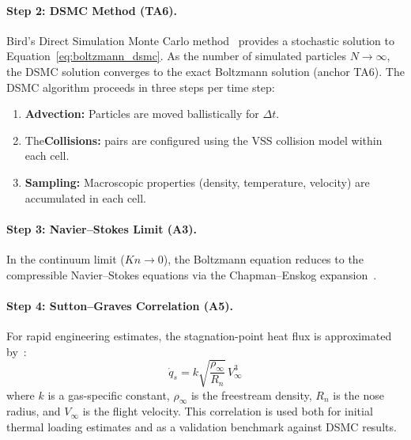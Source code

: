 \paragraph{Step 2: DSMC Method (TA6).}
Bird's Direct Simulation Monte Carlo method~\cite{bird1994molecular} provides a stochastic solution to Equation~\eqref{eq:boltzmann_dsmc}. As the number of simulated particles $N \to \infty$, the DSMC solution converges to the exact Boltzmann solution (anchor TA6). The DSMC algorithm proceeds in three steps per time step:
\begin{enumerate}
    \item \textbf{Advection:} Particles are moved ballistically for $\Delta t$.

    \item The\textbf{Collisions:} pairs are configured using the VSS collision model within each cell.

    \item \textbf{Sampling:} Macroscopic properties (density, temperature, velocity) are accumulated in each cell.
\end{enumerate}

\paragraph{Step 3: Navier--Stokes Limit (A3).}
In the continuum limit ($Kn \to 0$), the Boltzmann equation reduces to the compressible Navier--Stokes equations via the Chapman--Enskog expansion~\cite{chapman1970kinetic}.

\paragraph{Step 4: Sutton--Graves Correlation (A5).}
For rapid engineering estimates, the stagnation-point heat flux is approximated by~\cite{sutton1971gravesh}:
\begin{equation}
\dot{q}_s = k \sqrt{\frac{\rho_\infty}{R_n}} \, V_\infty^3
\label{eq:sutton_graves_methodology}
\end{equation}
where $k$ is a gas-specific constant, $\rho_\infty$ is the freestream density, $R_n$ is the nose radius, and $V_\infty$ is the flight velocity. This correlation is used both for initial thermal loading estimates and as a validation benchmark against DSMC results.


